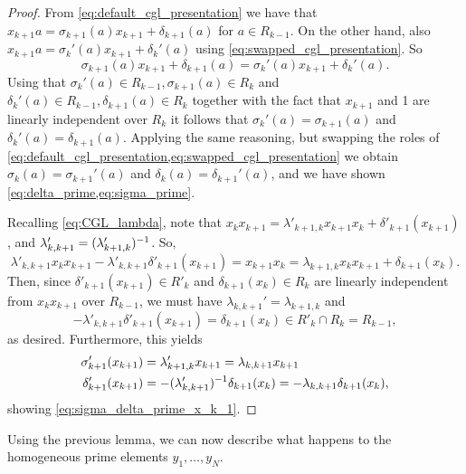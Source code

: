 \begin{proof}
	From \cref{eq:default_cgl_presentation} we have that $x_{k+1}a = \sigma_{k+1}(a)x_{k+1}
		+ \delta_{k+1}(a)$ for $a \in R_{k-1}$. On the other hand, also $x_{k+1}a =
		\sigma_k'(a)x_{k+1} + \delta_k'(a)$ using \cref{eq:swapped_cgl_presentation}. So
	\begin{equation*}
		\sigma_{k+1}(a)x_{k+1} + \delta_{k+1}(a) = \sigma_k'(a) x_{k+1} + \delta_k'(a).
	\end{equation*}
	Using that $\sigma_k'(a)\in R_{k-1}, \sigma_{k+1}(a) \in R_k$ and $\delta_k'(a) \in
		R_{k-1}, \delta_{k+1}(a) \in R_{k}$ together with the fact that $x_{k+1}$ and 1 are
	linearly independent over $R_k$ it follows that $\sigma_k'(a) = \sigma_{k+1}(a)$ and
	$\delta_k'(a) = \delta_{k+1}(a)$. Applying the same reasoning, but swapping the roles
	of \cref{eq:default_cgl_presentation,eq:swapped_cgl_presentation} we obtain
	$\sigma_k(a) = \sigma_{k+1}'(a)$ and $\delta_k(a) = \delta_{k+1}'(a)$, and we have
	shown \cref{eq:delta_prime,eq:sigma_prime}.

	Recalling \cref{eq:CGL_lambda}, note that $x_k x_{k+1} = \lambda'_{k+1,k}x_{k+1}x_{k} +
		\delta'_{k+1}(x_{k+1})$, and $\lambda'_{k,k+1} = (\lambda_{k+1, k}')^{-1}$. So,
	\begin{equation*}
		\lambda'_{k,k+1}x_k x_{k+1} - \lambda'_{k,k+1} \delta'_{k+1}(x_{k+1}) = x_{k+1} x_k = \lambda_{k+1, k} x_k x_{k+1} + \delta_{k+1}(x_k).
	\end{equation*}
	Then, since $\delta'_{k+1}(x_{k+1}) \in R'_k $ and $\delta_{k+1}(x_k) \in R_k$ are
	linearly independent from $x_k x_{k+1}$ over $R_{k-1}$, we must have $\lambda_{k,k+1}'
		= \lambda_{k+1,k}$ and
	\begin{equation*}
		-\lambda'_{k,k+1}\delta'_{k+1}(x_{k+1}) = \delta_{k+1}(x_k) \in R'_k \cap R_k = R_{k-1},
	\end{equation*}
	as desired. Furthermore, this yields
	\begin{align*}
		\sigma'_{k+1}(x_{k+1}) & = \lambda'_{k+1,k}x_{k+1} = \lambda_{k, k+1}x_{k+1}         \\
		\delta'_{k+1}(x_{k+1}) & = -(\lambda_{k,k+1}')^{-1} \delta_{k+1}(x_k) = - \lambda_{k,
			k+1}\delta_{k+1}(x_k),
	\end{align*}
	showing \cref{eq:sigma_delta_prime_x_k_1}.
\end{proof}

Using the previous lemma, we can now describe what happens to the homogeneous prime
elements $y_1, \dots, y_N$.

